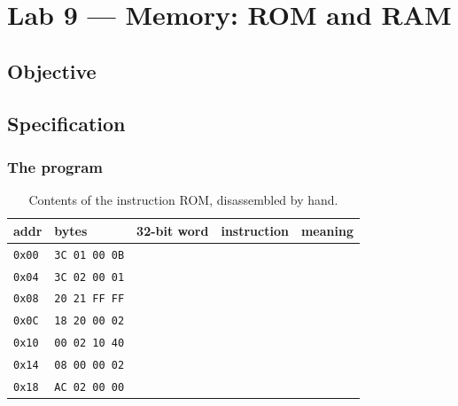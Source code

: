 
\chapter{Lab 9 --- Memory: ROM and RAM}

\section{Objective}

\section{Specification}

\subsection*{The program}

\begin{table}[htbp]
\centering
\caption{Contents of the instruction ROM, disassembled by hand.}
\label{tab:lab09-rom}
\begin{tabular}{lllll}
\toprule
addr & bytes & 32-bit word & instruction & meaning \\
\midrule
\texttt{0x00} & \texttt{3C 01 00 0B} & & & \\
\texttt{0x04} & \texttt{3C 02 00 01} & & & \\
\texttt{0x08} & \texttt{20 21 FF FF} & & & \\
\texttt{0x0C} & \texttt{18 20 00 02} & & & \\
\texttt{0x10} & \texttt{00 02 10 40} & & & \\
\texttt{0x14} & \texttt{08 00 00 02} & & & \\
\texttt{0x18} & \texttt{AC 02 00 00} & & & \\
\bottomrule
\end{tabular}
\end{table}


